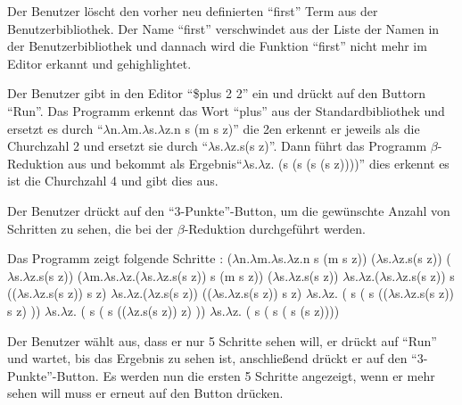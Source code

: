 \documentclass[parskip=full,11pt,twoside]{scrartcl}
\begin{document}
{Der Benutzer löscht den vorher neu definierten \enquote{first} Term aus der Benutzerbibliothek.}
{Der Name \enquote{first} verschwindet aus der Liste der Namen in der Benutzerbibliothek und dannach wird die Funktion \enquote{first} nicht mehr im Editor erkannt und gehighlightet.}

{Der Benutzer gibt in den Editor \enquote {\$plus 2 2} ein und drückt auf den Buttorn \enquote {Run}.}
{ Das Programm erkennt das Wort \enquote {plus} aus der Standardbibliothek und ersetzt es durch \enquote {$\lambda$n.$\lambda$m.$\lambda$s.$\lambda$z.n s (m s z)} die 2en erkennt er jeweils als die Churchzahl 2 und ersetzt sie durch \enquote {$\lambda$s.$\lambda$z.s(s z)}. Dann führt das Programm $\beta$-Reduktion aus und bekommt als Ergebnis\enquote {$\lambda$s.$\lambda$z. (s (s (s (s z))))} dies erkennt es ist die Churchzahl 4 und gibt dies aus. }


{ Der Benutzer drückt auf den \enquote {3-Punkte}-Button, um die gewünschte Anzahl von Schritten zu sehen, die bei der $\beta$-Reduktion durchgeführt werden. }

{ Das Programm zeigt folgende Schritte :
	\newline ($\lambda$n.$\lambda$m.$\lambda$s.$\lambda$z.n s (m s z)) ($\lambda$s.$\lambda$z.s(s z)) ($\lambda$s.$\lambda$z.s(s z))
	\newline ($\lambda$m.$\lambda$s.$\lambda$z.($\lambda$s.$\lambda$z.s(s z)) s (m s z)) ($\lambda$s.$\lambda$z.s(s z))
	\newline $\lambda$s.$\lambda$z.($\lambda$s.$\lambda$z.s(s z)) s (($\lambda$s.$\lambda$z.s(s z)) s z)
	\newline $\lambda$s.$\lambda$z.($\lambda$z.s(s z)) (($\lambda$s.$\lambda$z.s(s z)) s z)
	\newline $\lambda$s.$\lambda$z. ( s ( s (($\lambda$s.$\lambda$z.s(s z)) s z) ))
	\newline $\lambda$s.$\lambda$z. ( s ( s (($\lambda$z.s(s z)) z) ))
	\newline $\lambda$s.$\lambda$z. ( s ( s ( s (s z))))}

{Der Benutzer wählt aus, dass er nur 5 Schritte sehen will, er drückt auf \enquote {Run} und wartet, bis das Ergebnis zu sehen ist, anschließend drückt er auf den \enquote {3-Punkte}-Button.}
{Es werden nun die ersten 5 Schritte angezeigt, wenn er mehr sehen will muss er erneut auf den Button drücken.}
\end{document}
